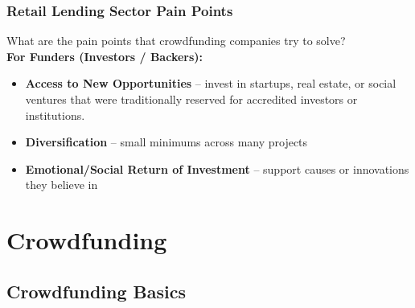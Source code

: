 \documentclass[aspectratio=169,xcolor=dvipsnames]{beamer}
\begin{document}

\begin{frame}
\frametitle{Retail Lending Sector Pain Points}


What are the pain points that crowdfunding companies try to solve? \\
\smallskip 
\textbf{For Funders (Investors / Backers):}
\begin{itemize}
    \item \textbf{Access to New Opportunities} -- invest in startups, real estate, or social ventures that were traditionally reserved for accredited investors or institutions.
    \item \textbf{Diversification} -- small minimums across many projects
    \item \textbf{Emotional/Social Return of Investment} -- support causes or innovations they believe in
\end{itemize}


	
\end{frame} 




\section{Crowdfunding}




\subsection{Crowdfunding Basics}




\end{document}
